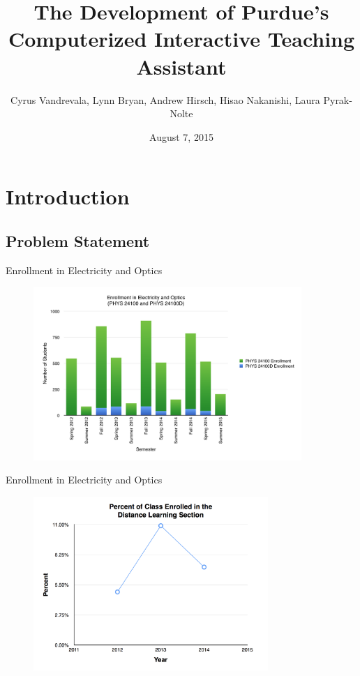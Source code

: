 \documentclass{beamer}
\title[The CITA on CHIP Project]{The Development of Purdue's Computerized Interactive Teaching Assistant}
\subtitle{Cyrus Vandrevala, Lynn Bryan, Andrew Hirsch, Hisao Nakanishi, Laura Pyrak-Nolte}
\date{August 7, 2015}
\begin{document}
\begin{frame}
  \titlepage
\end{frame}

\begin{frame}
  \tableofcontents
\end{frame}

\section{Introduction}

\subsection*{Problem Statement}

\begin{frame}{Enrollment in Electricity and Optics}
  \begin{figure}
    \includegraphics[width=4in]{img/chapter1/enrollment}
  \end{figure}
\end{frame}

\begin{frame}{Enrollment in Electricity and Optics}
  \begin{figure}
    \includegraphics[width=3.5in]{img/chapter1/percent}
  \end{figure}
\end{frame}
\end{document}
